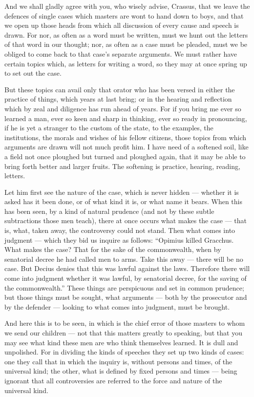  And we shall gladly agree with you, who wisely advise, Crassus, that we leave the defences of single cases which masters are wont to hand down to boys, and that we open up those heads from which all discussion of every cause and speech is drawn. For nor, as often as a word must be written, must we hunt out the letters of that word in our thought; nor, as often as a case must be pleaded, must we be obliged to come back to that case's separate arguments. We must rather have certain topics which, as letters for writing a word, so they may at once spring up to set out the case.

 But these topics can avail only that orator who has been versed in either the practice of things, which years at last bring; or in the hearing and reflection which by zeal and diligence has run ahead of years. For if you bring me ever so learned a man, ever so keen and sharp in thinking, ever so ready in pronouncing, if he is yet a stranger to the custom of the state, to the examples, the institutions, the morals and wishes of his fellow citizens, those topics from which arguments are drawn will not much profit him. I have need of a softened soil, like a field not once ploughed but turned and ploughed again, that it may be able to bring forth better and larger fruits. The softening is practice, hearing, reading, letters.

 Let him first see the nature of the case, which is never hidden — whether it is asked has it been done, or of what kind it is, or what name it bears. When this has been seen, by a kind of natural prudence (and not by these subtle subtractions those men teach), there at once occurs what makes the case — that is, what, taken away, the controversy could not stand. Then what comes into judgment — which they bid us inquire as follows: ``Opimius killed Gracchus. What makes the case? That for the sake of the commonwealth, when by senatorial decree he had called men to arms. Take this away — there will be no case. But Decius denies that this was lawful against the laws. Therefore there will come into judgment whether it was lawful, by senatorial decree, for the saving of the commonwealth.'' These things are perspicuous and set in common prudence; but those things must be sought, what arguments — both by the prosecutor and by the defender — looking to what comes into judgment, must be brought.

 And here this is to be seen, in which is the chief error of those masters to whom we send our children — not that this matters greatly to speaking, but that you may see what kind these men are who think themselves learned. It is dull and unpolished. For in dividing the kinds of speeches they set up two kinds of cases: one they call that in which the inquiry is, without persons and times, of the universal kind; the other, what is defined by fixed persons and times — being ignorant that all controversies are referred to the force and nature of the universal kind.

